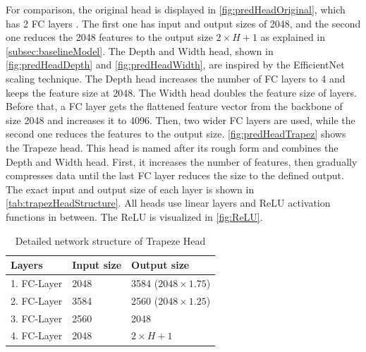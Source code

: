 \noindent For comparison, the original head is displayed in \autoref{fig:predHeadOriginal}, which has 2 \ac{FC} layers \cite{pytorch_linearLayer_docu}.
The first one has input and output sizes of 2048, and the second one reduces the 2048 features to the output size $2 \times H + 1$ as explained in \autoref{subsec:baselineModel}.
The Depth and Width head, shown in \autoref{fig:predHeadDepth} and \autoref{fig:predHeadWidth}, are inspired by the EfficientNet \cite{EfficientNet} scaling technique.
The Depth head increases the number of \ac{FC} layers to 4 and keeps the feature size at 2048.
The Width head doubles the feature size of layers.
Before that, a \ac{FC} layer gets the flattened feature vector from the backbone of size 2048 and increases it to 4096.
Then, two wider \ac{FC} layers are used, while the second one reduces the features to the output size.
\autoref{fig:predHeadTrapez} shows the Trapeze head.
This head is named after its rough form and combines the Depth and Width head.
First, it increases the number of features, then gradually compresses data until the last \ac{FC} layer reduces the size to the defined output.
The exact input and output size of each layer is shown in \autoref{tab:trapezHeadStructure}.
All heads use linear layers \cite{pytorch_linearLayer_docu} and \ac{ReLU} activation functions \cite{pytorch_relu_docu} in between.
The \ac{ReLU} is visualized in \autoref{fig:ReLU}.

\begin{table}[H]
    \centering
    \begin{tabular}{|l|l|l|}
        \hline
        \textbf{Layers} & \textbf{Input size} & \textbf{Output size}\\
        \hline
        1. FC-Layer & 2048 & 3584 ($2048 \times 1.75$)\\
        \hline
        2. FC-Layer & 3584 & 2560 ($2048 \times 1.25$)\\
        \hline
        3. FC-Layer & 2560 & 2048\\
        \hline
        4. FC-Layer & 2048 & \(2 \times H + 1\)\\
        \hline
    \end{tabular}
    \caption{Detailed network structure of Trapeze Head}
    \label{tab:trapezHeadStructure}
\end{table}

